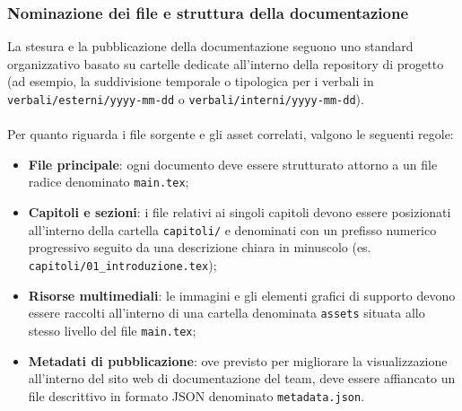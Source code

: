 \subsubsection{Nominazione dei file e struttura della documentazione}
La stesura e la pubblicazione della documentazione seguono uno standard organizzativo basato su cartelle dedicate all'interno della repository di progetto (ad esempio, la suddivisione temporale o tipologica per i verbali in \texttt{verbali/esterni/yyyy-mm-dd} o \texttt{verbali/interni/yyyy-mm-dd}). \\
\\
Per quanto riguarda i file sorgente e gli asset correlati, valgono le seguenti regole:
\begin{itemize}
    \item \textbf{File principale}: ogni documento deve essere strutturato attorno a un file radice denominato \texttt{main.tex};
    \item \textbf{Capitoli e sezioni}: i file relativi ai singoli capitoli devono essere posizionati all'interno della cartella \texttt{capitoli/} e denominati con un prefisso numerico progressivo seguito da una descrizione chiara in minuscolo (es. \texttt{capitoli/01\_introduzione.tex});
    \item \textbf{Risorse multimediali}: le immagini e gli elementi grafici di supporto devono essere raccolti all'interno di una cartella denominata \texttt{assets} situata allo stesso livello del file \texttt{main.tex};
    \item \textbf{Metadati di pubblicazione}: ove previsto per migliorare la visualizzazione all'interno del sito web di documentazione del team, deve essere affiancato un file descrittivo in formato JSON denominato \texttt{metadata.json}.
\end{itemize}

